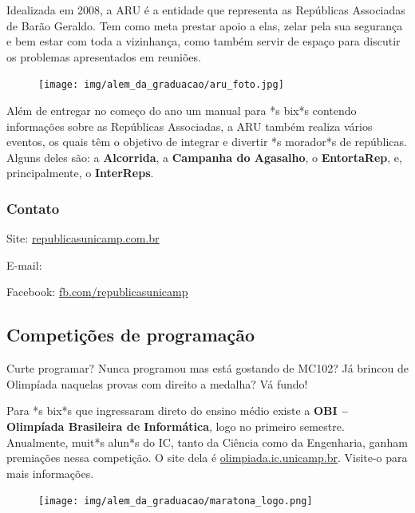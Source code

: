 Idealizada em 2008, a ARU é a entidade que representa as Repúblicas Associadas
de Barão Geraldo.  Tem como meta prestar apoio a elas, zelar pela sua segurança
e bem estar com toda a vizinhança, como também servir de espaço para discutir os
problemas apresentados em reuniões.

\begin{figure}[H]
    \centering
    \texttt{[image: img/alem\_da\_graduacao/aru\_foto.jpg]}
\end{figure}

Além de entregar no começo do ano um manual para *s bix*s contendo informações
sobre as Repúblicas Associadas, a ARU também realiza vários eventos, os quais
têm o objetivo de integrar e divertir *s morador*s de repúblicas. Alguns deles
são: a \textbf{Alcorrida}, a \textbf{Campanha do Agasalho}, o
\textbf{EntortaRep}, e, principalmente, o \textbf{InterReps}.

\subsubsection{Contato}

\begin{compactitemize}
    \item Site: \url{republicasunicamp.com.br}
    \item E-mail: 
    \item Facebook: \url{fb.com/republicasunicamp}
\end{compactitemize}

\subsection{Competições de programação}

Curte programar? Nunca programou mas está gostando de MC102? Já brincou de
Olimpíada naquelas provas com direito a medalha? Vá fundo!

Para *s bix*s que ingressaram direto do ensino médio existe a \textbf{OBI --
Olimpíada Brasileira de Informática}, logo no primeiro semestre.  Anualmente,
muit*s alun*s do IC, tanto da Ciência como da Engenharia, ganham premiações
nessa competição. O site dela é \url{olimpiada.ic.unicamp.br}.  Visite-o para
mais informações.

\begin{figure}[h!]
    \centering
    \texttt{[image: img/alem\_da\_graduacao/maratona\_logo.png]}
\end{figure}


